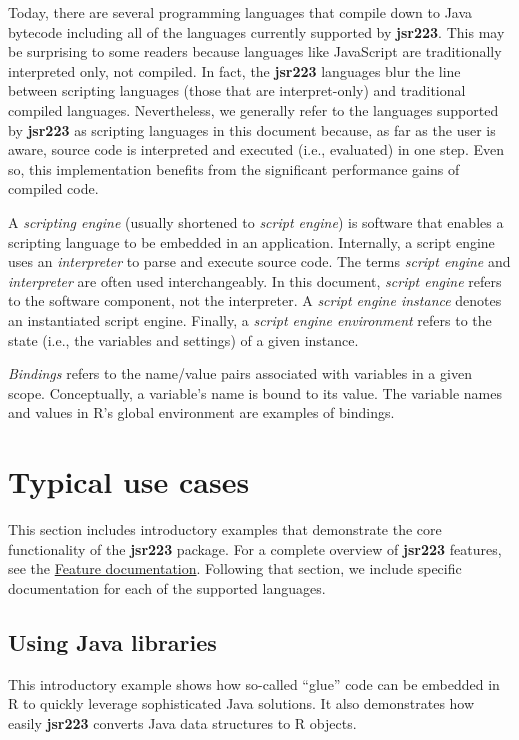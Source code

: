 \documentclass[
article,
11pt, %
a4paper, %
oneside, %
headinclude,footinclude, %
]{scrartcl}
\theoremstyle{definition} %
\theoremstyle{plain} %
\theoremstyle{remark} %
\newcommand{\pkg}[1]{\textbf{#1}}
\newcommand{\dfn}[1]{{\normalfont\textsl{#1}}}
\begin{document}
Today, there are several programming languages that compile down to Java bytecode including all of the languages currently supported by \pkg{jsr223}. This may be surprising to some readers because languages like JavaScript are traditionally interpreted only, not compiled. In fact, the \pkg{jsr223} languages blur the line between scripting languages (those that are interpret-only) and traditional compiled languages. Nevertheless, we generally refer to the languages supported by \pkg{jsr223} as scripting languages in this document because, as far as the user is aware, source code is interpreted and executed (i.e., evaluated) in one step. Even so, this implementation benefits from the significant performance gains of compiled code.

A \dfn{scripting engine} (usually shortened to \dfn{script engine}) is software that enables a scripting language to be embedded in an application. Internally, a script engine uses an \dfn{interpreter} to parse and execute source code. The terms \dfn{script engine} and \dfn{interpreter} are often used interchangeably. In this document, \dfn{script engine} refers to the software component, not the interpreter. A \dfn{script engine instance} denotes an instantiated script engine. Finally, a \dfn{script engine environment} refers to the state (i.e., the variables and settings) of a given instance.

\dfn{Bindings} refers to the name/value pairs associated with variables in a given scope. Conceptually, a variable's name is bound to its value. The variable names and values in R's global environment are examples of bindings.

\section{Typical use cases}

This section includes introductory examples that demonstrate the core functionality of the \pkg{jsr223} package. For a complete overview of \pkg{jsr223} features, see the \hyperlink{feature-documentation}{Feature documentation}. Following that section, we include specific documentation for each of the supported languages.

\subsection{Using Java libraries}

This introductory example shows how so-called ``glue'' code can be embedded in R to quickly leverage sophisticated Java solutions. It also demonstrates how easily \pkg{jsr223} converts Java data structures to R objects.
\end{document}
